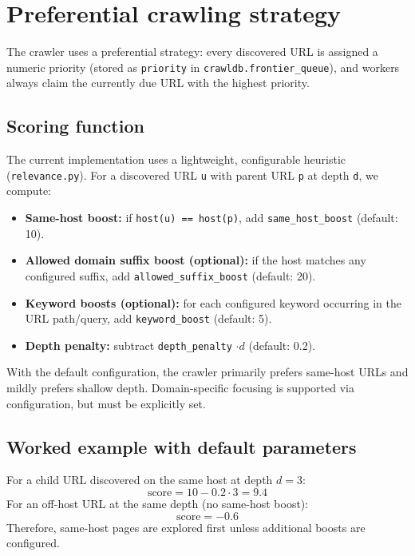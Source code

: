\documentclass[9pt]{IEEEtran}
\begin{document}
\section{Preferential crawling strategy}
The crawler uses a preferential strategy: every discovered URL is assigned a numeric priority (stored as \texttt{priority}
in \texttt{crawldb.frontier\_queue}), and workers always claim the currently due URL with the highest priority.

\subsection{Scoring function}
The current implementation uses a lightweight, configurable heuristic (\texttt{relevance.py}).
For a discovered URL \texttt{u} with parent URL \texttt{p} at depth \texttt{d}, we compute:
\begin{itemize}
    \item \textbf{Same-host boost:} if \texttt{host(u) == host(p)}, add \texttt{same\_host\_boost} (default: 10).
    \item \textbf{Allowed domain suffix boost (optional):} if the host matches any configured suffix, add \texttt{allowed\_suffix\_boost} (default: 20).
    \item \textbf{Keyword boosts (optional):} for each configured keyword occurring in the URL path/query, add \texttt{keyword\_boost} (default: 5).
    \item \textbf{Depth penalty:} subtract \texttt{depth\_penalty} $\cdot d$ (default: 0.2).
\end{itemize}

With the default configuration, the crawler primarily prefers same-host URLs and mildly prefers shallow depth. Domain-specific focusing is supported via configuration, but must be explicitly set.

\subsection{Worked example with default parameters}
For a child URL discovered on the same host at depth $d=3$:
\[
\text{score} = 10 - 0.2\cdot 3 = 9.4
\]
For an off-host URL at the same depth (no same-host boost):
\[\text{score} = -0.6\]
Therefore, same-host pages are explored first unless additional boosts are configured.
\end{document}
